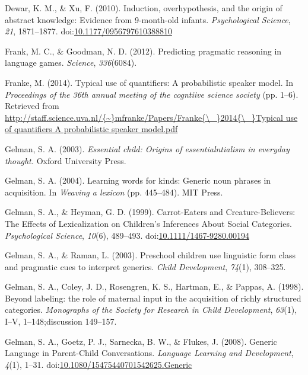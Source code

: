 \documentclass[english,floatsintext,man]{apa6}
\theoremstyle{definition}
\theoremstyle{definition}
\theoremstyle{definition}
\theoremstyle{remark}
\begin{document}
\hypertarget{ref-Dewar2010}{}
Dewar, K. M., \& Xu, F. (2010). Induction, overhypothesis, and the
origin of abstract knowledge: Evidence from 9-month-old infants.
\emph{Psychological Science}, \emph{21}, 1871--1877.
doi:\href{https://doi.org/10.1177/0956797610388810}{10.1177/0956797610388810}

\hypertarget{ref-Frank2012}{}
Frank, M. C., \& Goodman, N. D. (2012). Predicting pragmatic reasoning
in language games. \emph{Science}, \emph{336}(6084).

\hypertarget{ref-Franke2014cogsci}{}
Franke, M. (2014). Typical use of quantifiers: A probabilistic speaker
model. In \emph{Proceedings of the 36th annual meeting of the cogntiive
science society} (pp. 1--6). Retrieved from
\href{http://staff.science.uva.nl/\%7B~\%7Dmfranke/Papers/Franke\%7B/_\%7D2014\%7B/_\%7DTypical\%20use\%20of\%20quantifiers\%20A\%20probabilistic\%20speaker\%20model.pdf}{http://staff.science.uva.nl/\{\textasciitilde{}\}mfranke/Papers/Franke\{\textbackslash{}\_\}2014\{\textbackslash{}\_\}Typical use of quantifiers A probabilistic speaker model.pdf}

\hypertarget{ref-Gelman2003}{}
Gelman, S. A. (2003). \emph{Essential child: Origins of
essentialntialism in everyday thought.} Oxford University Press.

\hypertarget{ref-Gelman2004}{}
Gelman, S. A. (2004). Learning words for kinds: Generic noun phrases in
acquisition. In \emph{Weaving a lexicon} (pp. 445--484). MIT Press.

\hypertarget{ref-Gelman1999}{}
Gelman, S. A., \& Heyman, G. D. (1999). Carrot-Eaters and
Creature-Believers: The Effects of Lexicalization on Children's
Inferences About Social Categories. \emph{Psychological Science},
\emph{10}(6), 489--493.
doi:\href{https://doi.org/10.1111/1467-9280.00194}{10.1111/1467-9280.00194}

\hypertarget{ref-Gelman2003b}{}
Gelman, S. A., \& Raman, L. (2003). Preschool children use linguistic
form class and pragmatic cues to interpret generics. \emph{Child
Development}, \emph{74}(1), 308--325.

\hypertarget{ref-Gelman1998}{}
Gelman, S. A., Coley, J. D., Rosengren, K. S., Hartman, E., \& Pappas,
A. (1998). Beyond labeling: the role of maternal input in the
acquisition of richly structured categories. \emph{Monographs of the
Society for Research in Child Development}, \emph{63}(1), I--V,
1--148;discussion 149--157.

\hypertarget{ref-Gelman2008}{}
Gelman, S. A., Goetz, P. J., Sarnecka, B. W., \& Flukes, J. (2008).
Generic Language in Parent-Child Conversations. \emph{Language Learning
and Development}, \emph{4}(1), 1--31.
doi:\href{https://doi.org/10.1080/15475440701542625.Generic}{10.1080/15475440701542625.Generic}
\end{document}
